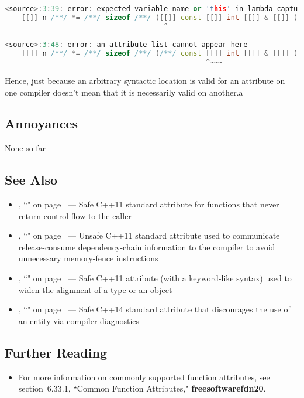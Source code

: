\begin{lstlisting}[language=C++]
<source>:3:39: error: expected variable name or 'this' in lambda capture list
    [[]] n /**/ *= /**/ sizeof /**/ ([[]] const [[]] int [[]] & [[]] ) /**/;
                                      ^

<source>:3:48: error: an attribute list cannot appear here
    [[]] n /**/ *= /**/ sizeof /**/ (/**/ const [[]] int [[]] & [[]] ) /**/;
                                                ^~~~
\end{lstlisting}
    
\noindent Hence, just because an arbitrary syntactic location is valid for an
attribute on one compiler doesn't mean that it is necessarily valid on
another.a

\subsection[Annoyances]{Annoyances}\label{annoyances}

None so far

\subsection[See Also]{See Also}\label{see-also}

\begin{itemize}
\item{\locationa, ``" on page~\pageref{the-noreturn-attribute} — Safe C++11 standard attribute for functions that never return control flow to the caller}
\item{\locatione, ``" on page~\pageref{carriesdependency} — Unsafe C++11 standard attribute used to communicate release-consume dependency-chain information to the compiler to avoid unnecessary memory-fence instructions}
\item{\locationa, ``" on page~\pageref{alignas} --- Safe C++11 attribute (with a keyword-like syntax) used to widen the alignment of a type or an object}
\item{\locationb, ``" on page~\pageref{deprecated} — Safe C++14 standard attribute that discourages the use of an entity via compiler diagnostics}
\end{itemize}

\subsection[Further Reading]{Further Reading}\label{attribute-further-reading}
\begin{itemize}
\item{For more information on commonly supported function attributes, see
section~6.33.1, ``Common Function Attributes," \textbf{{freesoftwarefdn20}}.}
\end{itemize}

